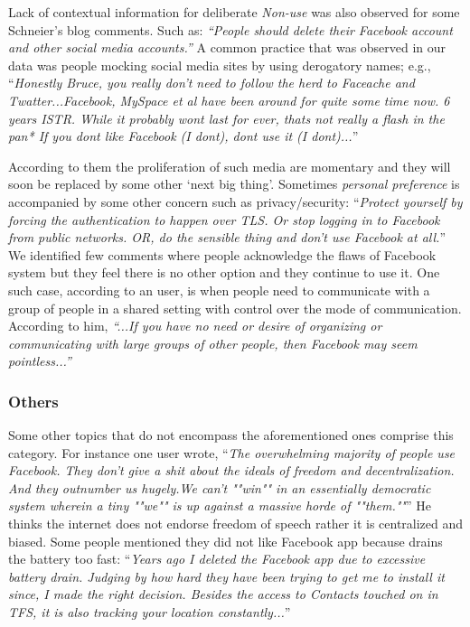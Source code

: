     Lack of contextual information for deliberate \emph{Non-use} was also observed for some Schneier's blog comments. Such as: \textit{``People should delete their Facebook account and other social media accounts.''} A common practice that was observed in our data was people mocking social media sites by using derogatory names; e.g., ``\textit{Honestly Bruce, you really don't need to follow the herd to Faceache and Twatter...Facebook, MySpace et al have been around for quite some time now. 6 years ISTR. While it probably wont last for ever, thats not really a flash in the pan* If you dont like Facebook (I dont), dont use it (I dont)...}''
    
    According to them the proliferation of such media are momentary and they will soon be replaced by some other `next big thing'. Sometimes \textit{personal preference} is accompanied by some other concern such as privacy/security: ``\textit{Protect yourself by forcing the authentication to happen over TLS. Or stop logging in to Facebook from public networks. OR, do the sensible thing and don't use Facebook at all.}'' We identified few comments where people acknowledge the flaws of Facebook system but they feel there is no other option and they continue to use it. One such case, according to an user, is when people need to communicate with a group of people in a shared setting with control over the mode of communication. According to him, \textit{``...If you have no need or desire of organizing or communicating with large groups of other people, then Facebook may seem pointless...''}
    
\subsubsection{Others}

Some other topics that do not encompass the aforementioned ones comprise this category. For instance one user wrote, ``\textit{The overwhelming majority of people use Facebook. They don't give a shit about the ideals of freedom and decentralization. And they outnumber us hugely.We can't ""win"" in an essentially democratic system wherein a tiny ""we"" is up against a massive horde of ""them.""}'' He thinks the internet does not endorse freedom of speech rather it is centralized and biased. Some people mentioned they did not like Facebook app because drains the battery too fast: ``\textit{Years ago I deleted the Facebook app due to excessive battery drain. Judging by how hard they have been trying to get me to install it since, I made the right decision. Besides the access to Contacts touched on in TFS, it is also tracking your location constantly...}''
    
